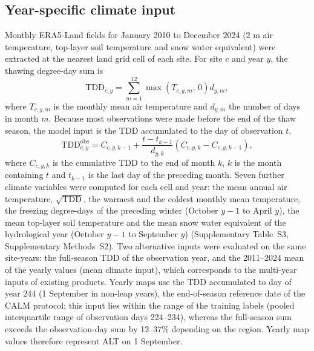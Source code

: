 


\subsection{Year-specific climate input}
Monthly ERA5-Land fields for January 2010 to December 2024\cite{munozsabater2021_era5_land} (2 m air temperature, top-layer soil temperature and snow water equivalent) were extracted at the nearest land grid cell of each site. For site $c$ and year $y$, the thawing degree-day sum is
\begin{equation}
\mathrm{TDD}_{c,y} = \sum_{m=1}^{12} \max\!\left(T_{c,y,m},\,0\right) d_{y,m},
\label{eq:tdd}
\end{equation}
where $T_{c,y,m}$ is the monthly mean air temperature and $d_{y,m}$ the number of days in month $m$. Because most observations were made before the end of the thaw season, the model input is the TDD accumulated to the day of observation $t$,
\begin{equation}
\mathrm{TDD}^{\mathrm{obs}}_{c,y} = C_{c,y,k-1} + \frac{t - t_{k-1}}{d_{y,k}} \left( C_{c,y,k} - C_{c,y,k-1} \right),
\label{eq:tddobs}
\end{equation}
where $C_{c,y,k}$ is the cumulative TDD to the end of month $k$, $k$ is the month containing $t$ and $t_{k-1}$ is the last day of the preceding month. Seven further climate variables were computed for each cell and year: the mean annual air temperature, $\sqrt{\mathrm{TDD}}$, the warmest and the coldest monthly mean temperature, the freezing degree-days of the preceding winter (October $y-1$ to April $y$), the mean top-layer soil temperature and the mean snow water equivalent of the hydrological year (October $y-1$ to September $y$) (Supplementary Table~S3, Supplementary Methods~S2). Two alternative inputs were evaluated on the same site-years: the full-season TDD of the observation year, and the 2011--2024 mean of the yearly values (mean climate input), which corresponds to the multi-year inputs of existing products. Yearly maps use the TDD accumulated to day of year 244 (1 September in non-leap years), the end-of-season reference date of the CALM protocol; this input lies within the range of the training labels (pooled interquartile range of observation days 224--234), whereas the full-season sum exceeds the observation-day sum by 12--37\% depending on the region. Yearly map values therefore represent ALT on 1 September.

